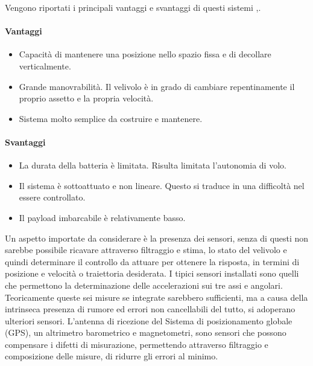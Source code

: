 Vengono riportati i principali vantaggi e svantaggi di questi sistemi \cite{DesTestCarm},\cite{irisquad}.
\paragraph{Vantaggi}
\begin{itemize}
	\item Capacità di mantenere una posizione nello spazio fissa e di decollare verticalmente.
	\item Grande manovrabilità. Il velivolo è in grado di cambiare repentinamente il proprio assetto e la propria velocità.
	\item Sistema molto semplice da costruire e mantenere.
\end{itemize}
\paragraph{Svantaggi}
\begin{itemize}
	\item La durata della batteria è limitata. Risulta limitata l'autonomia di volo.
	\item Il sistema è sottoattuato e non lineare. Questo si traduce in una difficoltà nel essere controllato.
	\item Il payload imbarcabile è relativamente basso.
\end{itemize}

Un aspetto importate da considerare è la presenza dei sensori, senza di questi non sarebbe possibile ricavare attraverso filtraggio e stima, lo stato del velivolo e quindi determinare il controllo da attuare per ottenere la risposta, in termini di posizione e velocità o traiettoria desiderata. I tipici sensori installati sono quelli che permettono la determinazione delle accelerazioni sui tre assi e angolari. Teoricamente queste sei misure se integrate sarebbero sufficienti, ma a causa della intrinseca presenza di rumore ed errori non cancellabili del tutto, si adoperano ulteriori sensori. L'antenna di ricezione del Sistema di posizionamento globale (GPS), un altrimetro barometrico e magnetometri, sono sensori che possono compensare i difetti di misurazione, permettendo attraverso filtraggio e composizione delle misure, di ridurre gli errori al minimo. 